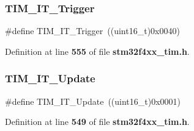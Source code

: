 \subsubsection{T\+I\+M\+\_\+\+I\+T\+\_\+\+Trigger}
{\footnotesize\ttfamily \#define T\+I\+M\+\_\+\+I\+T\+\_\+\+Trigger~((uint16\+\_\+t)0x0040)}



Definition at line \textbf{ 555} of file \textbf{ stm32f4xx\+\_\+tim.\+h}.

\mbox{\label{group__TIM__interrupt__sources_ga8fb63577fec9a3e7c7f5f3eb775ee624}} 
\subsubsection{T\+I\+M\+\_\+\+I\+T\+\_\+\+Update}
{\footnotesize\ttfamily \#define T\+I\+M\+\_\+\+I\+T\+\_\+\+Update~((uint16\+\_\+t)0x0001)}



Definition at line \textbf{ 549} of file \textbf{ stm32f4xx\+\_\+tim.\+h}.

